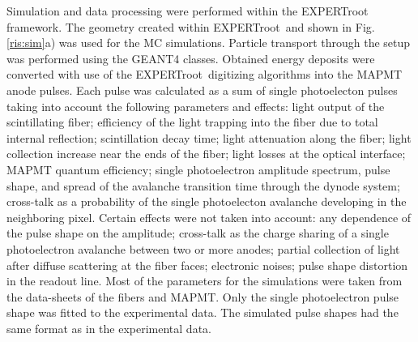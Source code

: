 \documentclass{webofc}
\newcommand{\er}{\textmd{EXPERTroot}}
\begin{document}
Simulation and data processing were performed within the \er\, framework.
The geometry created within \er\ and shown in Fig.\,\ref{ris:sim}a) was used for the MC simulations.
Particle transport through the setup was performed using the GEANT4 \cite{geant4} classes.
Obtained energy deposits were converted with use of the \er\ digitizing algorithms into the MAPMT anode pulses.
Each pulse was calculated as a sum of single photoelecton pulses taking into account the following parameters and effects: light output of the scintillating fiber; efficiency of the light trapping into the fiber due to total internal reflection; scintillation decay time; light attenuation along the fiber; light collection increase near the ends of the fiber; light losses at the optical interface; MAPMT quantum efficiency; single photoelectron amplitude spectrum, pulse shape, and spread of the avalanche transition time through the dynode system; cross-talk as a probability of the single photoelecton avalanche developing in the neighboring pixel.
Certain effects were not taken into account: any dependence of the pulse shape on the amplitude; cross-talk as the charge sharing of a single photoelectron avalanche between two or more anodes; partial collection of light after diffuse scattering at the fiber faces; electronic noises; pulse shape distortion in the readout line. Most of the parameters for the simulations were taken from the data-sheets of the fibers and MAPMT.  Only the single photoelectron pulse shape was fitted to the experimental data. The simulated pulse shapes had the same format as in the experimental data.
\end{document}

